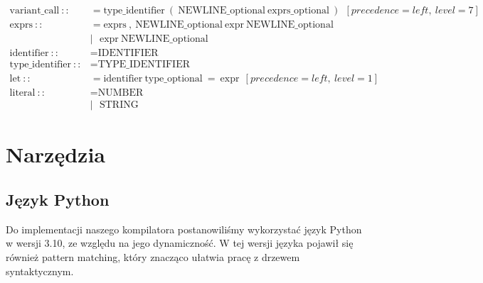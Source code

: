 \documentclass{article}
\begin{document}
\begin{align*}
  \text{variant\_call}\ ::            & = \text{type\_identifier}\ (\ \text{NEWLINE\_optional}\ \text{exprs\_optional}\ )\ \ [precedence=left,\ level=7]                                                                                                          \\
  \text{exprs}\ ::                    & = \text{exprs}\ ,\ \text{NEWLINE\_optional}\ \text{expr}\ \text{NEWLINE\_optional}                                                                                                                                        \\
                                      & |\ \ \ \text{expr}\ \text{NEWLINE\_optional}                                                                                                                                                                              \\
  \text{identifier}\ ::               & = \text{IDENTIFIER}                                                                                                                                                                                                       \\
  \text{type\_identifier}\ ::         & = \text{TYPE\_IDENTIFIER}                                                                                                                                                                                                 \\
  \text{let}\ ::                      & = \text{identifier}\ \text{type\_optional}\ =\ \text{expr}\ \ [precedence=left,\ level=1]                                                                                                                                 \\
  \text{literal}\ ::                  & = \text{NUMBER}                                                                                                                                                                                                           \\
                                      & |\ \ \ \text{STRING}
\end{align*}
\section{Narzędzia}
\subsection{Język Python}
Do implementacji naszego kompilatora postanowiliśmy wykorzystać język Python w wersji 3.10, ze względu na jego dynamiczność.
W tej wersji języka pojawił się również pattern matching, który znacząco ułatwia pracę z drzewem syntaktycznym.
\end{document}

